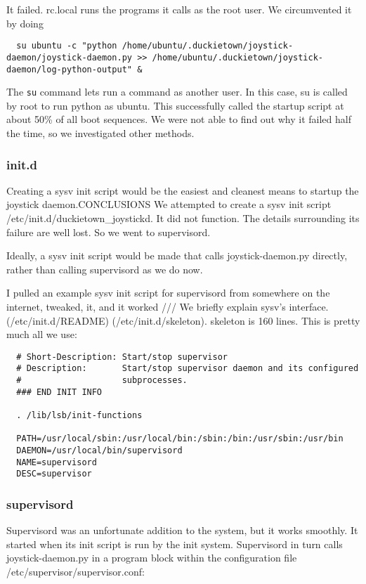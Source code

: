 \documentclass[titlepage]{article}
\begin{document}
It failed. rc.local runs the programs it calls as the root user. We circumvented it by doing 
\begin{lstlisting}
  su ubuntu -c "python /home/ubuntu/.duckietown/joystick-daemon/joystick-daemon.py >> /home/ubuntu/.duckietown/joystick-daemon/log-python-output" &                                                                   
\end{lstlisting}

The \texttt{su} command lets run a command as another user. In this case, su is called by root to run python as ubuntu. 
This successfully called the startup script at about 50\% of all boot sequences. 
We were not able to find out why it failed half the time, so we investigated other methods.

\subsubsection{init.d}
Creating a sysv init script would be the easiest and cleanest means to startup the joystick daemon.CONCLUSIONS
We attempted to create a sysv init script /etc/init.d/duckietown\_joystickd. 
It did not function. The details surrounding its failure are well lost. 
So we went to supervisord.

Ideally, a sysv init script would be made that calls joystick-daemon.py directly, rather than calling supervisord as we do now. 

I pulled an example sysv init script for supervisord from somewhere on the internet, tweaked, it, and it worked /// We briefly explain sysv's interface. (/etc/init.d/README) (/etc/init.d/skeleton).  skeleton is 160 lines. 
This is pretty much all we use:


\begin{lstlisting}
  # Short-Description: Start/stop supervisor
  # Description:       Start/stop supervisor daemon and its configured
  #                    subprocesses.
  ### END INIT INFO
  
  . /lib/lsb/init-functions
  
  PATH=/usr/local/sbin:/usr/local/bin:/sbin:/bin:/usr/sbin:/usr/bin
  DAEMON=/usr/local/bin/supervisord
  NAME=supervisord
  DESC=supervisor
\end{lstlisting}
\subsubsection{supervisord}
Supervisord was an unfortunate addition to the system, but it works smoothly. 
It started when its init script is run by the init system. 
Supervisord in turn calls joystick-daemon.py in a program block within the configuration file /etc/supervisor/supervisor.conf:
\end{document}
